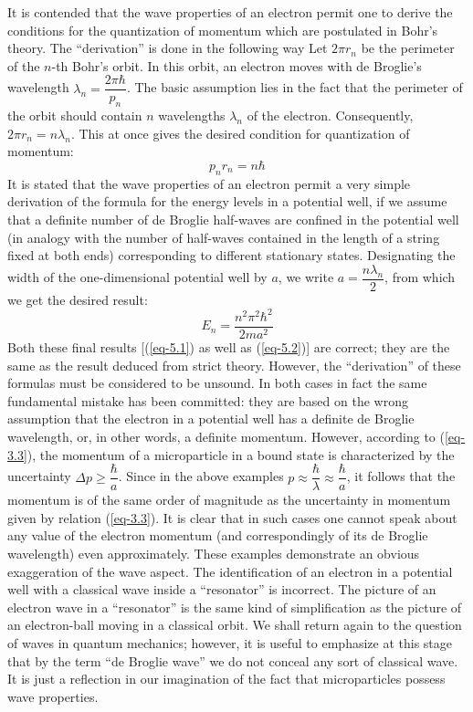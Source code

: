 \documentclass[a4paper,sfsidenotes,colorlinks=true]{tufte-book}
\numberwithin{equation}{section}
\numberwithin{figure}{section}
\begin{document}
It is contended that the wave properties of an
electron permit one to derive the conditions for the quantization of
momentum which are postulated in Bohr's theory. The ``derivation'' is
done in the following way Let $2 \pi r_{n}$ be the perimeter of the
$n$-th Bohr's orbit. In this orbit, an electron moves with de
Broglie's wavelength $\lambda_{n} = \dfrac{2 \pi \hbar }{p_{n}}$. The
basic assumption lies in the fact that the perimeter of the orbit
should contain $n$ wavelengths $\lambda_{n}$ of the
electron. Consequently, $2 \pi r_{n} = n \lambda_{n}$. This at once
gives the desired condition for quantization of momentum:
\begin{equation}%
p_{n}r_{n} = n \hbar 
\label{eq-5.1} 
\end{equation}
It is stated that the wave properties of an
electron permit a very simple derivation of the formula for the energy
levels in a potential well, if we assume that a definite number of de
Broglie half-waves are confined in the potential well (in analogy with
the number of half-waves contained in the length of a string fixed at
both ends) corresponding to different stationary states. Designating
the width of the one-dimensional potential well by $a$, we write $a =
\dfrac{n \lambda_{n}}{2}$, from which we get the desired result:
\begin{equation}%
E_{n} = \frac{n^{2} \pi^{2} \hbar^{2}}{2 m a^{2}}
\label{eq-5.2} 
\end{equation}
Both these final results [(\ref{eq-5.1}) as well as (\ref{eq-5.2})]
are correct; they are the same as the result deduced from strict
theory. However, the ``derivation'' of these formulas must be
considered to be unsound. In both cases in fact the same fundamental
mistake has been committed: they are based on the wrong assumption
that the electron in a potential well has a definite de Broglie
wavelength, or, in other words, a definite momentum. However,
according to (\ref{eq-3.3}), the momentum of a microparticle in a
bound state is characterized by the uncertainty $\Delta p \ge
\dfrac{\hbar}{a}$. Since in the above examples $p \approx
\dfrac{\hbar}{\lambda} \approx \dfrac{\hbar}{a}$, it follows that the
momentum is of the same order of magnitude as the uncertainty in
momentum given by relation (\ref{eq-3.3}). It is clear that in such
cases one cannot speak about any value of the electron momentum (and
correspondingly of its de Broglie wavelength) even
approximately.  These
examples demonstrate an obvious exaggeration of the wave aspect. The
identification of an electron in a potential well with a classical
wave inside a ``resonator'' is incorrect. The picture of an electron
wave in a ``resonator'' is the same kind of simplification as the
picture of an electron-ball moving in a classical orbit. We shall
return again to the question of waves in quantum mechanics; however,
it is useful to emphasize at this stage that by the term ``de Broglie
wave'' we do not conceal any sort of classical wave. It is just a
reflection in our imagination of the fact that microparticles
possess wave properties.
\end{document}
